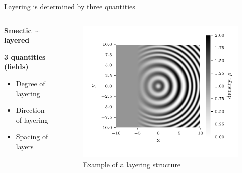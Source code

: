 \documentclass[10pt,mathserif]{beamer}
\newcommand{\extra}[1]{\color{gray} #1 \normalcolor}
\newcommand{\subheading}[1]{\large\textbf{#1}\normalsize}
\begin{document}
\begin{frame}[fragile]{Layering is determined by three quantities}
    \newrefsection
    \begin{columns}
        \begin{column}{0.49\textwidth}
            \vspace{-\fill}
            \begin{center}
                \subheading{Smectic $\sim$ layered}
                \vspace{3em}

                \subheading{3 quantities \extra{(fields)}}
            \end{center}
            \begin{itemize}
                \item Degree of layering
                \item Direction of layering %
                \item Spacing of layers
            \end{itemize}
        \end{column}
        \begin{column}{0.60\textwidth}
            \begin{figure}
                \includegraphics[width=\textwidth]{figures/layers_example.pdf}
                \caption{
                    Example of a layering structure
                }
            \end{figure}
        \end{column}
    \end{columns}
\end{frame}
\end{document}
